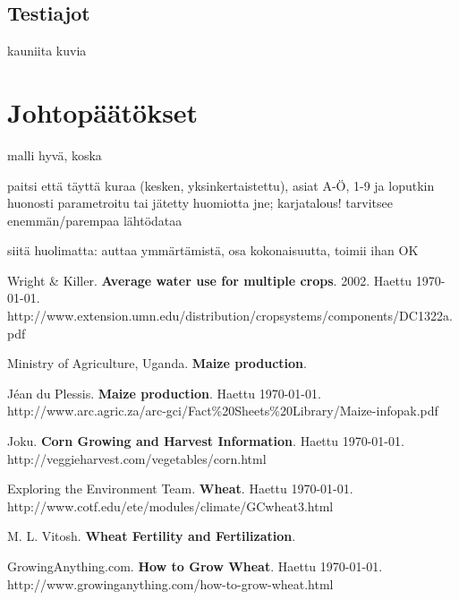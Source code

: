 \documentclass[12pt]{scrreprt}
\renewcommand\emph{\textbf}
\begin{document}
  \section{Testiajot}

  kauniita kuvia

  \chapter{Johtopäätökset}

  malli hyvä, koska
  
  paitsi että täyttä kuraa (kesken, yksinkertaistettu), asiat A-Ö, 1-9 ja
  loputkin huonosti parametroitu tai jätetty huomiotta jne; karjatalous!
  tarvitsee enemmän/parempaa lähtödataa
  
  siitä huolimatta: auttaa ymmärtämistä, osa kokonaisuutta, toimii ihan OK

  \begin{thebibliography}{9}

    Wright \& Killer.
    \emph{Average water use for multiple crops}.
    2002.
    Haettu \today. \\
    http://www.extension.umn.edu/distribution/cropsystems/components/DC1322a.pdf

    Ministry of Agriculture, Uganda.
    \emph{Maize production}.

    Jéan du Plessis.
    \emph{Maize production}.
    Haettu \today. \\
    http://www.arc.agric.za/arc-gci/Fact\%20Sheets\%20Library/Maize-infopak.pdf

    Joku.
    \emph{Corn Growing and Harvest Information}.
    Haettu \today. \\
    http://veggieharvest.com/vegetables/corn.html

    Exploring the Environment Team.
    \emph{Wheat}.
    Haettu \today. \\
    http://www.cotf.edu/ete/modules/climate/GCwheat3.html

    M. L. Vitosh.
    \emph{Wheat Fertility and Fertilization}.

    GrowingAnything.com.
    \emph{How to Grow Wheat}.
    Haettu \today. \\
    http://www.growinganything.com/how-to-grow-wheat.html
        
  \end{thebibliography}
\end{document}
